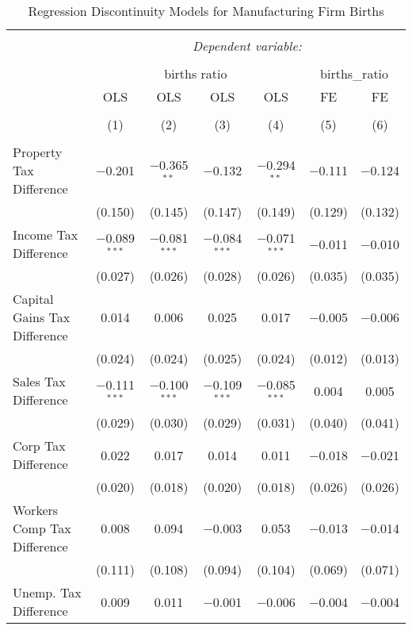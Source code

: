
\begin{table}[!htbp] \centering 
  \caption{Regression Discontinuity Models for  Manufacturing Firm Births} 
  \label{31-33rd} 
\begin{tabular}{@{\extracolsep{5pt}}lcccccc} 
\\[-1.8ex]\hline 
\hline \\[-1.8ex] 
 & \multicolumn{6}{c}{\textit{Dependent variable:}} \\ 
\cline{2-7} 
\\[-1.8ex] & \multicolumn{4}{c}{births ratio} & \multicolumn{2}{c}{births\_ratio} \\ 
 & OLS & OLS & OLS & OLS & FE & FE \\ 
\\[-1.8ex] & (1) & (2) & (3) & (4) & (5) & (6)\\ 
\hline \\[-1.8ex] 
 Property Tax Difference & $-$0.201 & $-$0.365$^{**}$ & $-$0.132 & $-$0.294$^{**}$ & $-$0.111 & $-$0.124 \\ 
  & (0.150) & (0.145) & (0.147) & (0.149) & (0.129) & (0.132) \\ 
  Income Tax Difference & $-$0.089$^{***}$ & $-$0.081$^{***}$ & $-$0.084$^{***}$ & $-$0.071$^{***}$ & $-$0.011 & $-$0.010 \\ 
  & (0.027) & (0.026) & (0.028) & (0.026) & (0.035) & (0.035) \\ 
  Capital Gains Tax Difference & 0.014 & 0.006 & 0.025 & 0.017 & $-$0.005 & $-$0.006 \\ 
  & (0.024) & (0.024) & (0.025) & (0.024) & (0.012) & (0.013) \\ 
  Sales Tax Difference & $-$0.111$^{***}$ & $-$0.100$^{***}$ & $-$0.109$^{***}$ & $-$0.085$^{***}$ & 0.004 & 0.005 \\ 
  & (0.029) & (0.030) & (0.029) & (0.031) & (0.040) & (0.041) \\ 
  Corp Tax Difference & 0.022 & 0.017 & 0.014 & 0.011 & $-$0.018 & $-$0.021 \\ 
  & (0.020) & (0.018) & (0.020) & (0.018) & (0.026) & (0.026) \\ 
  Workers Comp Tax Difference & 0.008 & 0.094 & $-$0.003 & 0.053 & $-$0.013 & $-$0.014 \\ 
  & (0.111) & (0.108) & (0.094) & (0.104) & (0.069) & (0.071) \\ 
  Unemp. Tax Difference & 0.009 & 0.011 & $-$0.001 & $-$0.006 & $-$0.004 & $-$0.004 \\ 

\end{tabular}
\end{table}
